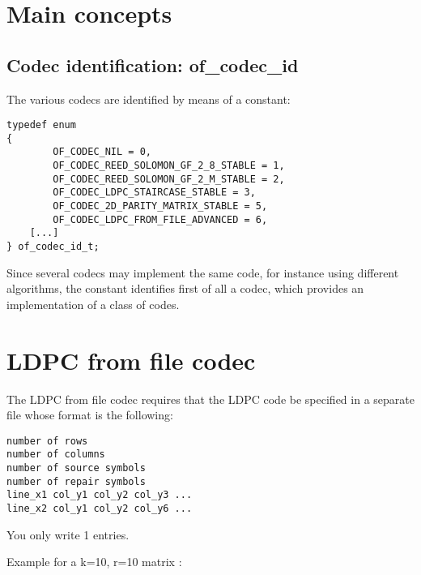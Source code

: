 \documentclass[a4paper,11pt]{article}
\begin{document}
{\section{Main concepts}


\subsection{Codec identification: of\_codec\_id}

The various codecs are identified by means of a constant:
\begin{verbatim}
typedef enum
{
        OF_CODEC_NIL = 0,
        OF_CODEC_REED_SOLOMON_GF_2_8_STABLE = 1,
        OF_CODEC_REED_SOLOMON_GF_2_M_STABLE = 2,
        OF_CODEC_LDPC_STAIRCASE_STABLE = 3,
        OF_CODEC_2D_PARITY_MATRIX_STABLE = 5,
        OF_CODEC_LDPC_FROM_FILE_ADVANCED = 6,
	[...]
} of_codec_id_t;
\end{verbatim}
Since several codecs may implement the same code, for instance using different
algorithms, the constant identifies first of all a codec, which provides an
implementation of a class of codes.

\section{LDPC from file codec}

The LDPC from file codec requires that the LDPC code be specified
in a separate file whose format is the following:

\begin{verbatim}
number of rows
number of columns
number of source symbols
number of repair symbols
line_x1 col_y1 col_y2 col_y3 ...
line_x2 col_y1 col_y2 col_y6 ...
\end{verbatim}

You only write 1 entries.

Example for a k=10, r=10 matrix :

}
\end{document}
